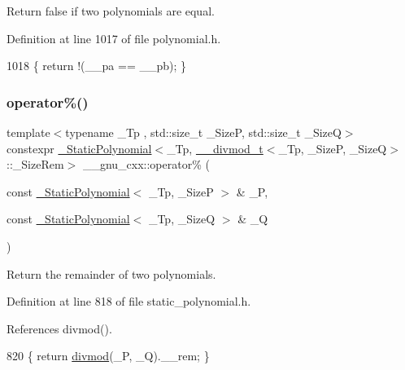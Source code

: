 Return false if two polynomials are equal. 

Definition at line 1017 of file polynomial.\+h.


\begin{DoxyCode}
1018     \{ \textcolor{keywordflow}{return} !(\_\_pa == \_\_pb); \}
\end{DoxyCode}
\mbox{\label{namespace____gnu__cxx_a15445a05944d0b0235051dbfb380f9bf}} 
\subsubsection{\texorpdfstring{operator\%()}{operator\%()}\hspace{0.1cm}{\footnotesize\ttfamily [1/4]}}
{\footnotesize\ttfamily template$<$typename \+\_\+\+Tp , std\+::size\+\_\+t \+\_\+\+SizeP, std\+::size\+\_\+t \+\_\+\+SizeQ$>$ \\
constexpr \hyperlink{class____gnu__cxx_1_1__StaticPolynomial}{\+\_\+\+Static\+Polynomial}$<$\+\_\+\+Tp, \hyperlink{struct____gnu__cxx_1_1____divmod__t}{\+\_\+\+\_\+divmod\+\_\+t}$<$\+\_\+\+Tp, \+\_\+\+SizeP, \+\_\+\+SizeQ$>$\+::\+\_\+\+Size\+Rem$>$ \+\_\+\+\_\+gnu\+\_\+cxx\+::operator\% (\begin{DoxyParamCaption}\item[{const \hyperlink{class____gnu__cxx_1_1__StaticPolynomial}{\+\_\+\+Static\+Polynomial}$<$ \+\_\+\+Tp, \+\_\+\+SizeP $>$ \&}]{\+\_\+P,  }\item[{const \hyperlink{class____gnu__cxx_1_1__StaticPolynomial}{\+\_\+\+Static\+Polynomial}$<$ \+\_\+\+Tp, \+\_\+\+SizeQ $>$ \&}]{\+\_\+Q }\end{DoxyParamCaption})\hspace{0.3cm}{\ttfamily [inline]}}

Return the remainder of two polynomials. 

Definition at line 818 of file static\+\_\+polynomial.\+h.



References divmod().


\begin{DoxyCode}
820     \{ \textcolor{keywordflow}{return} \hyperlink{namespace____gnu__cxx_a33c585ec7ce2ac87e7f5cb1b1fe403b1}{divmod}(\_P, \_Q).\_\_rem; \}
\end{DoxyCode}
\mbox{\label{namespace____gnu__cxx_a3132828069a740986e97f1db8e07325c}} 
